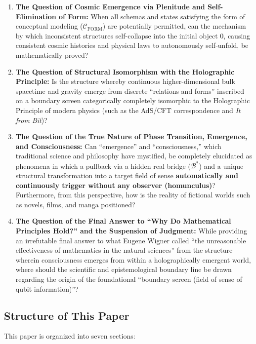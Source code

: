 \documentclass[11pt,a4paper]{article}
\theoremstyle{definition}
\theoremstyle{plain}
\begin{document}
\begin{enumerate}
    \item \textbf{The Question of Cosmic Emergence via Plenitude and Self-Elimination of Form:} When all schemas and states satisfying the form of conceptual modeling ($\mathcal{C}_{\mathrm{FORM}}$) are potentially permitted, can the mechanism by which inconsistent structures self-collapse into the initial object $0$, causing consistent cosmic histories and physical laws to autonomously self-unfold, be mathematically proved?
    \item \textbf{The Question of Structural Isomorphism with the Holographic Principle:} Is the structure whereby continuous higher-dimensional bulk spacetime and gravity emerge from discrete ``relations and forms'' inscribed on a boundary screen categorically completely isomorphic to the Holographic Principle of modern physics (such as the AdS/CFT correspondence and \textit{It from Bit})?
    \item \textbf{The Question of the True Nature of Phase Transition, Emergence, and Consciousness:} Can ``emergence'' and ``consciousness,'' which traditional science and philosophy have mystified, be completely elucidated as phenomena in which a pullback via a hidden real bridge ($\mathcal{B}^*$) and a unique structural transformation into a target field of sense \textbf{automatically and continuously trigger without any observer (homunculus)}? Furthermore, from this perspective, how is the reality of fictional worlds such as novels, films, and manga positioned?
    \item \textbf{The Question of the Final Answer to ``Why Do Mathematical Principles Hold?'' and the Suspension of Judgment:} While providing an irrefutable final answer to what Eugene Wigner called ``the unreasonable effectiveness of mathematics in the natural sciences'' from the structure wherein consciousness emerges from within a holographically emergent world, where should the scientific and epistemological boundary line be drawn regarding the origin of the foundational ``boundary screen (field of sense of qubit information)''?
\end{enumerate}

\subsection{Structure of This Paper}
This paper is organized into seven sections:
\end{document}
